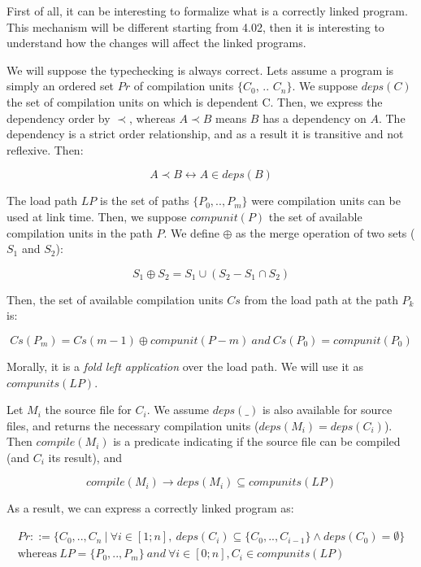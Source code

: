 \documentclass[11pt,a4paper]{article}
\begin{document}
First of all, it can be interesting to formalize what is a correctly linked
program. This mechanism will be different starting from 4.02, then it is
interesting to understand how the changes will affect the linked programs.

We will suppose the typechecking is always correct. Lets assume a program is
simply an ordered set $Pr$ of compilation units $\{C_0$, .. $C_n\}$. We suppose
$deps(C)$ the set of compilation units on which is dependent C. Then, we express
the dependency order by $\prec$, whereas $A \prec B$ means $B$ has a dependency
on $A$. The dependency is a strict order relationship, and as a result it is
transitive and not reflexive. Then:

$$A \prec B \leftrightarrow A \in deps(B)$$



The load path $LP$ is the set of paths $\{P_0, .., P_m\}$ were compilation units
can be used at link time. Then, we suppose $compunit(P)$ the set of available
compilation units in the path $P$. We define $\oplus$ as the merge operation of
two sets ($S_1$ and $S_2$):

$$S_1 \oplus S_2 = S_1 \cup (S_2 - S_1 \cap S_2) $$

Then, the set of available compilation units $Cs$ from the load path at the path
$P_k$ is: 

$$Cs(P_m) = Cs(m-1) \oplus compunit(P-m) ~and~ Cs(P_0) = compunit(P_0)$$

Morally, it is a \emph{fold left application} over the load path. We will use it
as $compunits(LP)$.

Let $M_i$ the source file for $C_i$. We assume $deps(\_)$ is also available for
source files, and returns the necessary compilation units ($deps(M_i) =
deps(C_i)$). Then $compile(M_i)$ is a predicate indicating if the source file
can be compiled (and $C_i$ its result), and

\begin{equation}
compile(M_i) \rightarrow deps(M_i) \subseteq compunits(LP)
\label{compile}
\end{equation}

As a result, we can express a correctly linked program as:

\begin{multline}
Pr ::= \{ C_0, .., C_n ~|~ \forall i \in [1; n], ~deps(C_i) \subseteq \{ C_0, ..,
    C_{i-1} \} \land deps(C_0) = \emptyset \}\\
    \text{whereas} ~ LP = \{ P_0, .., P_m \}~and~\forall i \in [0; n], C_i \in compunits(LP)
\label{linkable}
\end{multline}
\end{document}
